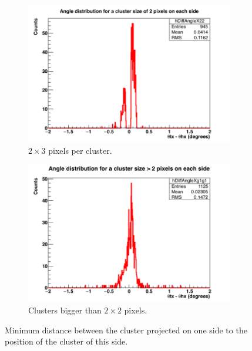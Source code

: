 \begin{figure}[!h]
      \begin{subfigure}[t]{0.45\textwidth}
        \centering
        \includegraphics[width = \textwidth]{Pictures/deformation/hDiffAngleX22_226056.png}
        \caption{$2 \times 3$ pixels per cluster.}
        \label{fig:angRes2x3}
      \end{subfigure}
      \quad
      \begin{subfigure}[t]{0.45\textwidth}
        \centering
        \includegraphics[width = \textwidth]{Pictures/deformation/hDiffAngleXg1g1_226056.png}
        \caption{Clusters bigger than $2 \times 2$ pixels.}
      \end{subfigure}
      \caption{Minimum distance between the cluster projected on one side to the position of the cluster of this side.}
      \label{fig:anglResDecomposed}
   \end{figure}
   


